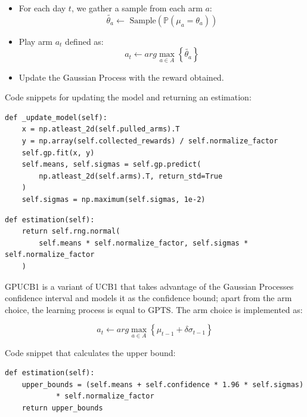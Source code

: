 \begin{itemize}
	\item For each day $t$, we gather a sample from each arm $a$:
		\begin{displaymath}
			\tilde{\theta_a} \leftarrow \text{ Sample} \left( \mathbb{P}(\mu_a = \theta_a) \right)
		\end{displaymath}
	\item Play arm $a_t$ defined as:
		\begin{displaymath}
			a_t \leftarrow arg\max_{a \in A} \left\{ \tilde{\theta_a} \right\}
		\end{displaymath}
	\item Update the Gaussian Process with the reward obtained.
\end{itemize}

Code snippets for updating the model and returning an estimation:

\begin{lstlisting}[style=Python]
def _update_model(self):
	x = np.atleast_2d(self.pulled_arms).T
	y = np.array(self.collected_rewards) / self.normalize_factor
	self.gp.fit(x, y)
	self.means, self.sigmas = self.gp.predict(
		np.atleast_2d(self.arms).T, return_std=True
	)
	self.sigmas = np.maximum(self.sigmas, 1e-2)
\end{lstlisting}

\begin{lstlisting}[style=Python]
def estimation(self):
	return self.rng.normal(
		self.means * self.normalize_factor, self.sigmas * self.normalize_factor
	)
\end{lstlisting}

GPUCB1 is a variant of UCB1 that takes advantage of the Gaussian Processes confidence interval and models it as the confidence bound; apart from the arm choice, the learning process is equal to GPTS. The arm choice is implemented as:

\begin{displaymath}
	a_t \leftarrow arg\max_{a \in A} \left\{ \mu_{t-1} + \delta \sigma_{t-1} \right\}
\end{displaymath}

Code snippet that calculates the upper bound:

\begin{lstlisting}[style=Python]
def estimation(self):
	upper_bounds = (self.means + self.confidence * 1.96 * self.sigmas)
			* self.normalize_factor
	return upper_bounds
\end{lstlisting}


